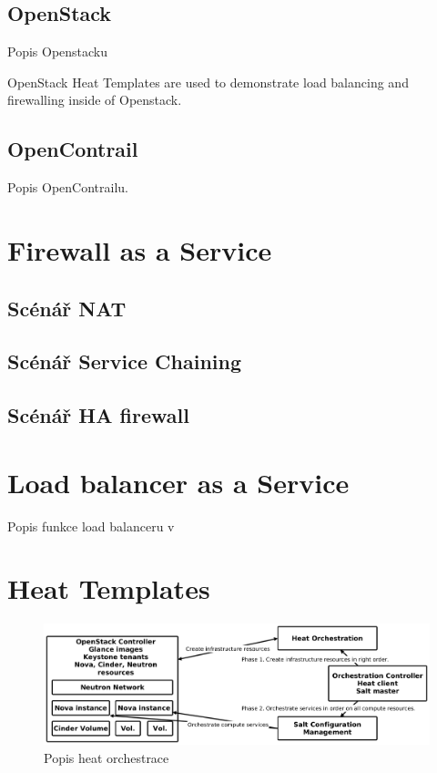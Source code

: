 \subsection{OpenStack}\label{sub:interaction}

Popis Openstacku

OpenStack Heat Templates are used to demonstrate load balancing and firewalling inside of Openstack.

\subsection{OpenContrail}\label{sub:interaction}

Popis OpenContrailu.


\section{Firewall as a Service}


\subsection{Scénář NAT}

\subsection{Scénář Service Chaining}

\subsection{Scénář HA firewall}


\section{Load balancer as a Service}

Popis funkce load balanceru v 


\section{Heat Templates}



\begin{figure}[h]
\begin{centering}
\includegraphics[scale=0.21]{images/heat}
\par\end{centering}
\caption{Popis heat orchestrace\label{fig:heat}}
\end{figure}

